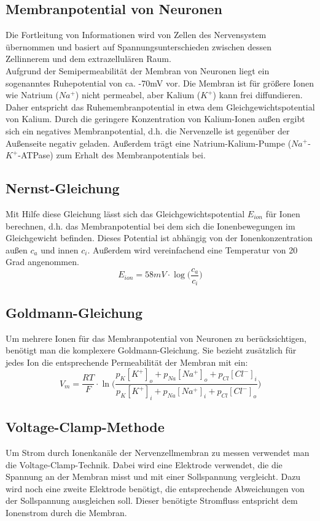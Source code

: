 \documentclass[11pt]{article}
\begin{document}
\subsection{Membranpotential von Neuronen}
Die Fortleitung von Informationen wird von Zellen des Nervensystem übernommen und basiert auf Spannungsunterschieden zwischen dessen Zellinnerem und dem extrazellulären Raum. \\
Aufgrund der Semipermeabilität der Membran von Neuronen liegt ein sogenanntes Ruhepotential von ca. -70mV vor. Die Membran ist für größere Ionen wie Natrium ($Na^{+}$) nicht permeabel, aber Kalium ($K^{+}$) kann frei diffundieren. Daher entspricht das Ruhemembranpotential in etwa dem Gleichgewichtspotential von Kalium. Durch die geringere Konzentration von Kalium-Ionen außen ergibt sich ein negatives Membranpotential, d.h. die Nervenzelle ist gegenüber der Außenseite negativ geladen. Außerdem trägt eine Natrium-Kalium-Pumpe ($Na^{+}$-$K^+$-ATPase) zum Erhalt des Membranpotentials bei.  


\subsection{Nernst-Gleichung}
Mit Hilfe diese Gleichung lässt sich das Gleichgewichtspotential $E_{ion}$ für Ionen berechnen, d.h. das Membranpotential bei dem sich die Ionenbewegungen im Gleichgewicht befinden. Dieses Potential ist abhängig von der Ionenkonzentration außen $c_a$ und innen $c_i$. Außerdem wird vereinfachend eine Temperatur von 20 Grad angenommen. 
\begin{equation}
\label{nernst}
E_{ion} = 58mV \cdot \log\bigg(\dfrac{c_a}{c_i}\bigg)
\end{equation}

\subsection{Goldmann-Gleichung}
Um mehrere Ionen für das Membranpotential von Neuronen zu berücksichtigen, benötigt man die komplexere Goldmann-Gleichung. Sie bezieht zusätzlich für jedes Ion die entsprechende Permeabilität der Membran mit ein:
\begin{equation}
\label{goldmann}
V_m = \frac{RT}{F}\cdot \ln\bigg(\frac{p_K[K^+]_o+p_{Na}[Na^+]_o+p_{Cl}[Cl^-]_i}{p_K[K^+]_i+p_{Na}[Na^+]_i+p_{Cl}[Cl^-]_o}\bigg)
\end{equation}

\subsection{Voltage-Clamp-Methode}
Um Strom durch Ionenkanäle der Nervenzellmembran zu messen verwendet man die Voltage-Clamp-Technik. Dabei wird eine Elektrode verwendet, die die Spannung an der Membran misst und mit einer Sollspannung vergleicht. Dazu wird noch eine zweite Elektrode benötigt, die entsprechende Abweichungen von der Sollspannung ausgleichen soll. Dieser benötigte Stromfluss entspricht dem Ionenstrom durch die Membran. 
\end{document}

